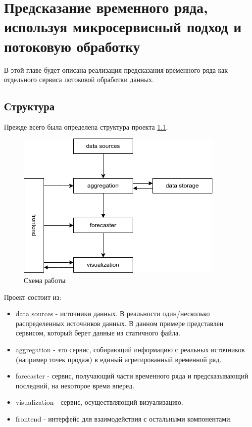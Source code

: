 \chapter{Предсказание временного ряда, используя микросервисный подход и потоковую обработку}
\begin{annotation}
  В этой главе будет описана реализация предсказания временного ряда как отдельного сервиса потоковой обработки данных. 
\end{annotation}

\section{Структура}
Прежде всего была определена структура проекта \ref{pic:arch}.

\begin{figure}[!htb]
	\begin{center}
	\includegraphics[width=.7\columnwidth]{./img/arch.png}
	\end{center}
	\caption{Схема работы}
	\label{pic:arch}
\end{figure}
\FloatBarrier

Проект состоит из:
\begin{itemize}
  \item data sources - источники данных. В реальности один/несколько распределенных источников данных. В данном примере представлен сервисом, который берет данные из статичного файла.
  \item aggregation - это сервис, собирающий информацию с реальных источников (например точек продаж) в единый агрегированный временной ряд.
  \item forecaster - сервис, получающий части временного ряда и предсказывающий последний, на некоторое время вперед.
  \item visualization - сервис, осуществляющий визуализацию.
  \item frontend - интерфейс для взаимодействия с остальными компонентами.
\end{itemize}


